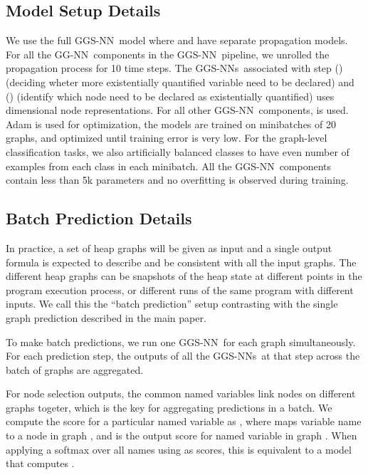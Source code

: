 \documentclass{article} \usepackage{iclr2016_conference,times}
\newcommand{\OurMethodMinorShort}{GG-NN}
\newcommand{\OurMethodShort}{GGS-NN}
\newcommand{\OurMethodShorts}{\OurMethodShort s}
\begin{document}
\subsection{Model Setup Details}
We use the full \OurMethodShort~model
where  and  have separate propagation models.
For all the \OurMethodMinorShort~components in the \OurMethodShort~pipeline,
we unrolled the propagation process for 10 time steps. The
\OurMethodShorts~associated with step () (deciding wheter
more existentially quantified variable need to be declared) and ()
(identify which node need to be declared as existentially quantified) uses
 dimensional node representations.  For all other
\OurMethodShort~components,  is used.  Adam \citep{kingma2014adam} is
used for optimization, the models are trained on minibatches of 20 graphs, and
optimized until training error is very low. For the graph-level classification tasks, we also
artificially balanced classes to have even number of examples from each class
in each minibatch. All the \OurMethodShort~components contain less than 5k
parameters and no overfitting is observed during training.


\subsection{Batch Prediction Details}
\label{appendix:batch-prediction}

In practice, a set of heap graphs will be given as input and a single output
formula is expected to describe and be consistent with all the input graphs.
The different heap graphs can be snapshots of the heap state at different
points in the program execution process, or different runs of the same program
with different inputs. We call this the ``batch prediction'' setup contrasting
with the single graph prediction described in the main paper.

To make batch predictions, we run one \OurMethodShort~for each graph
simultaneously. For each prediction step, the outputs of all the \OurMethodShorts~at
that step across the batch of graphs are aggregated.

For node selection outputs, the common named
variables link nodes on different graphs togeter, which is the key for
aggregating predictions in a batch.  We compute the score for a particular named
variable  as , where  maps
variable name  to a node in graph , and  is the output score for named
variable  in graph . When applying a softmax over all names using 
as scores, this is equivalent to a model that computes .
\end{document}
